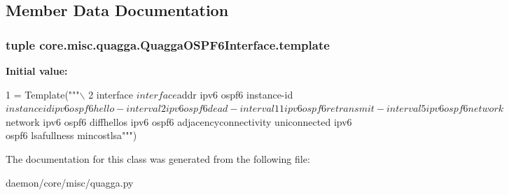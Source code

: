 \subsection{Member Data Documentation}
\hypertarget{classcore_1_1misc_1_1quagga_1_1_quagga_o_s_p_f6_interface_a07ede4a5abea001e093188d36055d0a4}{
\subsubsection[{template}]{\setlength{\rightskip}{0pt plus 5cm}tuple core.\+misc.\+quagga.\+Quagga\+O\+S\+P\+F6\+Interface.\+template\hspace{0.3cm}{\ttfamily [static]}}}\label{classcore_1_1misc_1_1quagga_1_1_quagga_o_s_p_f6_interface_a07ede4a5abea001e093188d36055d0a4}
{\bfseries Initial value\+:}
\begin{DoxyCode}
1 = Template(\textcolor{stringliteral}{"""\(\backslash\)}
2 \textcolor{stringliteral}{interface $interface  $addr  ipv6 ospf6 instance-id $instanceid  ipv6 ospf6 hello-interval 2  ipv6 ospf6
       dead-interval 11  ipv6 ospf6 retransmit-interval 5  ipv6 ospf6 network $network  ipv6 ospf6 diffhellos  ipv6
       ospf6 adjacencyconnectivity uniconnected  ipv6 ospf6 lsafullness mincostlsa"""})
\end{DoxyCode}


The documentation for this class was generated from the following file\+:\begin{DoxyCompactItemize}
\item 
daemon/core/misc/quagga.\+py\end{DoxyCompactItemize}
